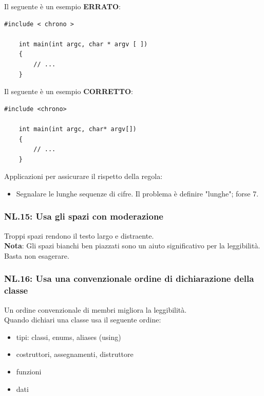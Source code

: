 \textsf{\small Il seguente è un esempio \textbf{\color{red}ERRATO}\normalcolor:}

\begin{lstlisting}[frame=single, rulecolor=\color{red}]
	#include < chrono >
	
	int main(int argc, char * argv [ ])
	{
		// ...
	}
\end{lstlisting}

\textsf{\small Il seguente è un esempio \textbf{\color{ForestGreen}CORRETTO}\normalcolor:}

\begin{lstlisting}[frame=single, rulecolor=\color{ForestGreen}]
	#include <chrono>
	
	int main(int argc, char* argv[])
	{
		// ...
	}
\end{lstlisting}

\textsf{\small Applicazioni per assicurare il rispetto della regola: }

\begin{itemize}
	\item \textsf{\small Segnalare le lunghe sequenze di cifre. Il problema è definire "lunghe"; forse 7.}
\end{itemize}

\subsubsection{NL.15: Usa gli spazi con moderazione}

\textsf{\small Troppi spazi rendono il testo largo e distraente.} \\

\textsf{\small \textbf{Nota}: Gli spazi bianchi ben piazzati sono un aiuto significativo per la leggibilità. Basta non esagerare.} \\

\subsubsection{NL.16: Usa una convenzionale ordine di dichiarazione della classe}

\textsf{\small Un ordine convenzionale di membri migliora la leggibilità.} \\

\textsf{\small Quando dichiari una classe usa il seguente ordine: } \\

\begin{itemize}
	\item \textsf{\small tipi: classi, enums, aliases (using)}
	\item \textsf{\small costruttori, assegnamenti, distruttore}
	\item \textsf{\small funzioni}
	\item \textsf{\small dati}
\end{itemize}

